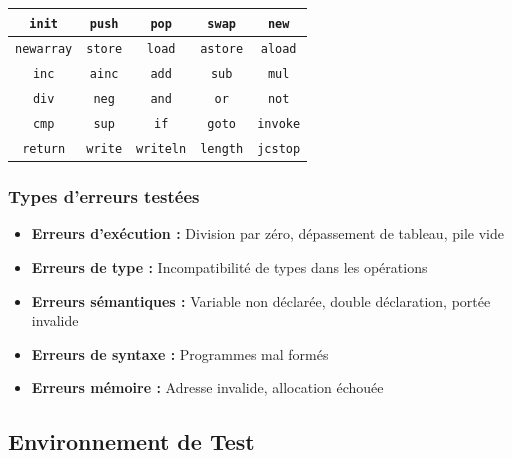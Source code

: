 \begin{center}
\begin{tabular}{|c|c|c|c|c|}
\hline
\rowcolor{headerblue!20}
\texttt{init} & \texttt{push} & \texttt{pop} & \texttt{swap} & \texttt{new} \\
\hline
\texttt{newarray} & \texttt{store} & \texttt{load} & \texttt{astore} & \texttt{aload} \\
\hline
\texttt{inc} & \texttt{ainc} & \texttt{add} & \texttt{sub} & \texttt{mul} \\
\hline
\texttt{div} & \texttt{neg} & \texttt{and} & \texttt{or} & \texttt{not} \\
\hline
\texttt{cmp} & \texttt{sup} & \texttt{if} & \texttt{goto} & \texttt{invoke} \\
\hline
\texttt{return} & \texttt{write} & \texttt{writeln} & \texttt{length} & \texttt{jcstop} \\
\hline
\end{tabular}
\end{center}

\subsubsection{Types d'erreurs testées}

\begin{itemize}
    \item \textbf{Erreurs d'exécution :} Division par zéro, dépassement de tableau, pile vide
    \item \textbf{Erreurs de type :} Incompatibilité de types dans les opérations
    \item \textbf{Erreurs sémantiques :} Variable non déclarée, double déclaration, portée invalide
    \item \textbf{Erreurs de syntaxe :} Programmes mal formés
    \item \textbf{Erreurs mémoire :} Adresse invalide, allocation échouée
\end{itemize}

\subsection{Environnement de Test}

